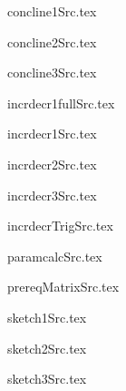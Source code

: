\documentclass{article}
\begin{document}

concline1Src.tex



concline2Src.tex



concline3Src.tex



incrdecr1fullSrc.tex



incrdecr1Src.tex



incrdecr2Src.tex



incrdecr3Src.tex



incrdecrTrigSrc.tex



paramcalcSrc.tex



prereqMatrixSrc.tex



sketch1Src.tex



sketch2Src.tex



sketch3Src.tex


\end{document}
